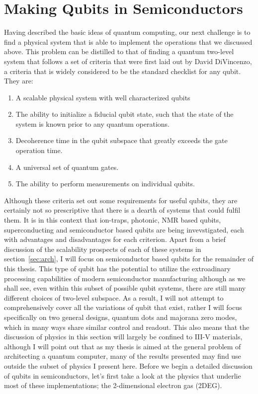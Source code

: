 \section{Making Qubits in Semiconductors}
\label{sec:qcinsm}
Having described the basic ideas of quantum computing, our next challenge is to find a physical system that
is able to implement the operations that we discussed above. This problem can be distilled to that
of finding a quantum two-level system that follows a set of criteria that were first laid out by David
DiVincenzo, a criteria that is widely considered to be the standard checklist for any qubit\cite{divincenzo_crit}. They are:
\begin{enumerate}
  \item A scalable physical system with well characterized qubits
  \item The ability to initialize a fiducial qubit state, such that the state of the system is known prior
    to any quantum operations.
  \item Decoherence time in the qubit subspace that greatly exceeds the gate operation time.
  \item A universal set of quantum gates.
  \item The ability to perform measurements on individual qubits.
\end{enumerate}
Although these criteria set out some requirements for useful qubits, they are certainly not so prescriptive
that there is a dearth of systems that could fulfil them. It is in this context that ion-traps, photonic,
NMR based qubits, superconducting and semiconductor based qubits are being invevstigated, each with advantages
and disadvantages for each criterion. Apart from a brief discussion of the scalability prospects of each of these systems
in section~\ref{sec:arch}, I will focus on semiconductor based qubits for the remainder of this thesis. This type
of qubit has the potential to utilize the extroadinary processing capabilities of modern semiconductor manufacturing
although as we shall see, even within this subset of possible qubit systems, there are still many different
choices of two-level subspace. As a result, I will not attempt to comprehensively cover all the variations
of qubit that exist, rather I will focus specifically on two general designs, quantum dots and majorana zero modes,
which in many ways share similar control and readout. This also means that the discussion of physics in this section will
largely be confined to III-V materials, although I will point out that as my thesis is aimed at the general
problem of architecting a quantum computer, many of the results presented may find use outside the subset of physics
I present here. Before we begin a detailed discussion of qubits in semiconductors, let's first take a look
at the physics that underlie most of these implementations; the 2-dimensional electron gas (2DEG).

